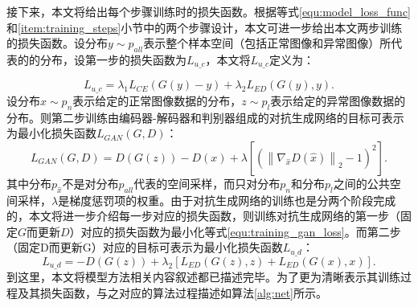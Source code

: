 接下来，本文将给出每个步骤训练时的损失函数。根据等式\ref{equ:model_loss_func}和\ref{item:training_steps}小节中的两个步骤设计，本文可进一步给出本文两步训练的损失函数。设分布$y\sim p_{all}$表示整个样本空间（包括正常图像和异常图像）所代表的的分布，设第一步的损失函数为${L}_{u\_c}$，本文将${L}_{u\_c}$定义为：

\begin{equation}
L_{u\_c} = \lambda_{1} L_{CE}(G(y)-y) + \lambda_{2}L_{ED}(G(y), y).
\end{equation}
\noindent 设分布$x\sim p_n$表示给定的正常图像数据的分布，$z\sim p_l$表示给定的异常图像数据的分布。则第二步训练由编码器-解码器和判别器组成的对抗生成网络的目标可表示为最小化损失函数$L_{GAN}(G, D)$：
\begin{equation}\label{equ:training_gan_loss}
L_{GAN}(G, D)=D(G(z))-D(x)+\lambda \left[\left(\left\|\nabla_{\hat{x}} D(\hat{x})\right\|_{2}-1\right)^{2}\right].
\end{equation}
其中分布$p_{\hat{x}}$不是对分布$p_{all}$代表的空间采样，而只对分布$p_n$和分布$p_l$之间的公共空间采样，$\lambda$是梯度惩罚项的权重。由于对抗生成网络的训练也是分两个阶段完成的，本文将进一步介绍每一步对应的损失函数，则训练对抗生成网络的第一步（固定$G$而更新$D$）对应的损失函数为最小化等式\ref{equ:training_gan_loss}。而第二步（固定D而更新G）对应的目标可表示为最小化损失函数${L}_{u\_d}$：
\begin{equation*}
	{L}_{u\_d}=-D\left(G(z)\right) + \lambda_{2}\left[L_{ED}(G(z), z) + L_{ED}(G(x), x)\right].
\end{equation*}
\noindent 到这里，本文将模型方法相关内容叙述都已描述完毕。为了更为清晰表示其训练过程及其损失函数，与之对应的算法过程描述如算法\ref{alg:net}所示。
